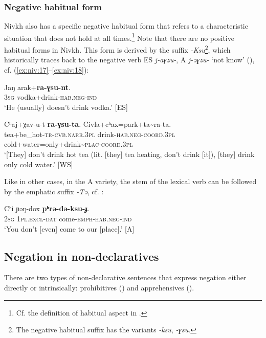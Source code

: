 \documentclass[output=paper,colorlinks,citecolor=brown]{langscibook}
\begin{document}
\subsubsection{Negative habitual form}\label{sec:niv:2.1.3} 
Nivkh also has a specific negative habitual form that refers to a characteristic situation that does not hold at all times.\footnote{Cf. the definition of habitual aspect in \citep[27]{Comrie1976}.} Note that there are no positive habitual forms in Nivkh. This form is derived by the suffix \textit{-Ksu}\footnote{The negative habitual suffix has the variants \textit{-ksu}, \textit{-ɣsu}.}, which historically traces back to the negative verb ES \textit{j-aɣzu-}, A \textit{j-əɣzu-} ‘not know’ (), cf. (\ref{ex:niv:17}--\ref{ex:niv:18}):

\ea\label{ex:niv:17}
    \gll Jaŋ arak+\textbf{ra-ɣsu-nt}. \\ 
         \textsc{3sg} vodka+drink-\textsc{hab.neg-ind} \\
    \glt ‘He (usually) doesn’t drink vodka.’ [ES]
\z 

\ea\label{ex:niv:18}
    \gll Cʰaj+χav-u-t \textbf{ra-ɣsu-ta}. Civla+cʰax=park+ta{\textasciitilde}ra-ta.\\ 
         tea+be\_hot-\textsc{tr-cvb.narr.3pl} drink-\textsc{hab.neg-coord.3pl} cold+water=only+drink{\textasciitilde}\textsc{plac}{}-\textsc{coord.3pl}\\
    \glt ‘[They] don’t drink hot tea (lit. [they] tea heating, don’t drink [it]), [they] drink only cold water.’ \citep[161]{Panfilov1965} [WS]
\z 

Like in other cases, in the A variety, the stem of the lexical verb can be followed by the emphatic suffix \textit{-Tə}, cf. :

\ea\label{ex:niv:19}
    \gll Cʰi ɲəŋ-dox \textbf{pʰrə-də-ksu-ɟ}. \\ 
         2\textsc{sg} 1\textsc{pl}.\textsc{excl-dat} come-\textsc{emph-hab.neg-ind} \\
    \glt ‘You don’t [even] come to our [place].’ \citep[161]{Panfilov1965} [A]
\z 

\subsection{Negation in non-declaratives}\label{sec:niv:2.2} 

There are two types of non-declarative sentences that express negation either directly or intrinsically: prohibitives () and apprehensives ().
\end{document}
